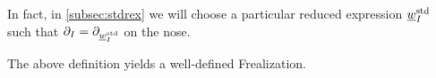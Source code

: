\begin{defn}
\begin{itemize}
\end{itemize}
\end{defn}

In fact, in \cref{subsec:stdrex} we will choose a particular reduced expression $\underline{w}_I^{\operatorname{std}}$ such that $\partial_I = \partial_{\underline{w}_I^{\operatorname{std}}}$ on the nose.

\begin{lemma}\label{lemma deformed affine frobenius realization is frobenius} The above definition yields a well-defined Frealization. \end{lemma}

